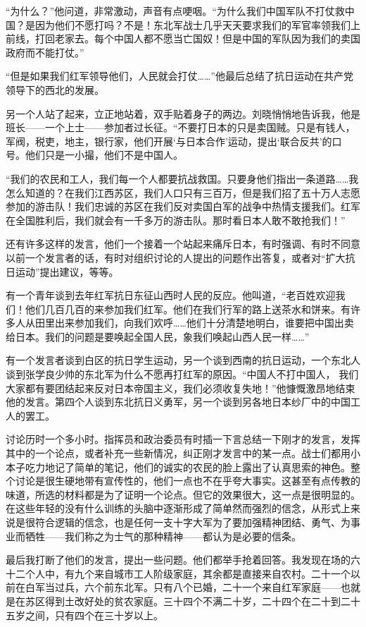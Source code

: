 \documentclass[10pt]{book}
\begin{document}
“为什么？”他问道，非常激动，声音有点哽咽。“为什么我们中国军队不打仗救中国？是因为他们不愿打吗？不是！东北军战士几乎天天要求我们的军官率领我们上前线，打回老家去。每个中国人都不愿当亡国奴！但是中国的军队因为我们的卖国政府而不能打仗。”

“但是如果我们红军领导他们，人民就会打仗……”他最后总结了抗日运动在共产党领导下的西北的发展。

另一个人站了起来，立正地站着，双手贴着身子的两边。刘晓悄悄地告诉我，他是班长——一个上士——参加者过长征。“不要打日本的只是卖国贼。只是有钱人，军阀，税吏，地主，银行家，他们开展‘与日本合作’运动，提出‘联合反共’的口号。他们只是一小撮，他们不是中国人。

“我们的农民和工人，我们每一个人都要抗战救国。只要身他们指出一条道路……我怎么知道的？在我们江西苏区，我们人口只有三百万，但是我们招了五十万人志愿参加的游击队！我们忠诚的苏区在我们反对卖国白军的战争中热情支援我们。红军在全国胜利后，我们就会有一千多万的游击队。那时看日本人敢不敢抢我们！”

还有许多这样的发言，他们一个接着一个站起来痛斥日本，有时强调、有时不同意以前一个发言者的话，有时对组织讨论的人提出的问题作出答复，或者对“扩大抗日运动”提出建议，等等。

有一个青年谈到去年红军抗日东征山西时人民的反应。他叫道，“老百姓欢迎我们！他们几百几百的来参加我们红军。他们在我们行军的路上送茶水和饼来。有许多人从田里出来参加我们，向我们欢呼……他们十分清楚地明白，谁要把中国出卖给日本。我们的问题是要唤起全国人民，象我们唤起山西人民一样……”

有一个发言者谈到白区的抗日学生运动，另一个谈到西南的抗日运动，一个东北人谈到张学良少帅的东北军为什么不愿再打红军的原因。“中国人不打中国人， 我们大家都有要团结起来反对日本帝国主义，我们必须收复失地！”他慷慨激昂地结束他的发言。第四个人谈到东北抗日义勇军，另一个谈到另各地日本纱厂中的中国工人的罢工。

讨论历时一个多小时。指挥员和政治委员有时插一下言总结一下刚才的发言，发挥其中的一个论点，或者补充一些新情况，纠正刚才发言中的某一点。战士们都用小本子吃力地记了简单的笔记，他们的诚实的农民的脸上露出了认真思索的神色。整个讨论是很生硬地带有宣传性的，他们一点也不在乎夸大事实。这甚至有点传教的味道，所选的材料都是为了证明一个论点。但它的效果很大，这一点是很明显的。在这些年轻的没有什么训练的头脑中逐渐形成了简单然而强烈的信念，从形式上来说是很符合逻辑的信念，也是任何一支十字大军为了要加强精神团结、勇气、为事业而牺牲——我们称之为士气的那种精神——都认为是必要的信条。

最后我打断了他们的发言，提出一些问题。他们都举手抢着回答。我发现在场的六十二个人中，有九个来自城市工人阶级家庭，其余都是直接来自农村。二十一个以前在白军当过兵，六个前东北军。只有八个已婚，二十一个来自红军家庭——也就是在苏区得到土改好处的贫农家庭。三十四个不满二十岁，二十四个在二十到二十五岁之间，只有四个在三十岁以上。
\end{document}

